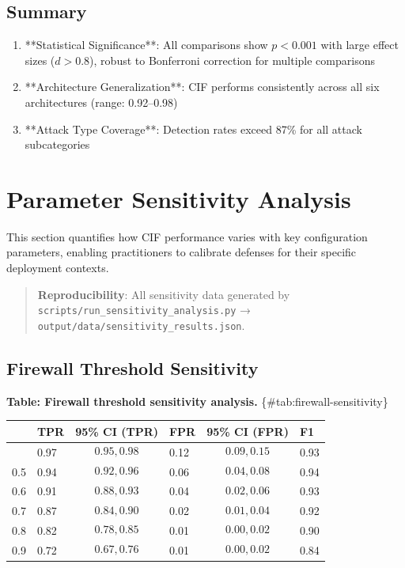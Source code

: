 \documentclass[
]{article}
\newcounter{none} %
\begin{document}
\subsection{Summary}\label{sec:stats-summary}

\begin{enumerate}
\item **Statistical Significance**: All comparisons show $p < 0.001$ with large effect sizes ($d > 0.8$), robust to Bonferroni correction for multiple comparisons
\item **Architecture Generalization**: CIF performs consistently across all six architectures (range: 0.92--0.98)
\item **Attack Type Coverage**: Detection rates exceed 87\% for all attack subcategories
\end{enumerate}

\newpage

\newpage

\section{Parameter Sensitivity Analysis}\label{sec:sensitivity}

This section quantifies how CIF performance varies with key
configuration parameters, enabling practitioners to calibrate defenses
for their specific deployment contexts.

\begin{quote}
\textbf{Reproducibility}: All sensitivity data generated by
\texttt{scripts/run\_sensitivity\_analysis.py} →
\texttt{output/data/sensitivity\_results.json}.
\end{quote}

\subsection{Firewall Threshold
Sensitivity}\label{sec:firewall-sensitivity}

\textbf{Table: Firewall threshold sensitivity analysis.}
\{\#tab:firewall-sensitivity\}

{\def\LTcaptype{none} %
\begin{longtable}[]{@{}llllll@{}}
\toprule\noalign{}
\(\tau) & TPR & 95\% CI (TPR) & FPR & 95\% CI (FPR) & F1 \\
\midrule\noalign{}
\endhead
\bottomrule\noalign{}
\endlastfoot
0.4 & 0.97 & \[0.95, 0.98\] & 0.12 & \[0.09, 0.15\] & 0.93 \\
0.5 & 0.94 & \[0.92, 0.96\] & 0.06 & \[0.04, 0.08\] & 0.94 \\
0.6 & 0.91 & \[0.88, 0.93\] & 0.04 & \[0.02, 0.06\] & 0.93 \\
0.7 & 0.87 & \[0.84, 0.90\] & 0.02 & \[0.01, 0.04\] & 0.92 \\
0.8 & 0.82 & \[0.78, 0.85\] & 0.01 & \[0.00, 0.02\] & 0.90 \\
0.9 & 0.72 & \[0.67, 0.76\] & 0.01 & \[0.00, 0.02\] & 0.84 \\
\end{longtable}
}
\end{document}

